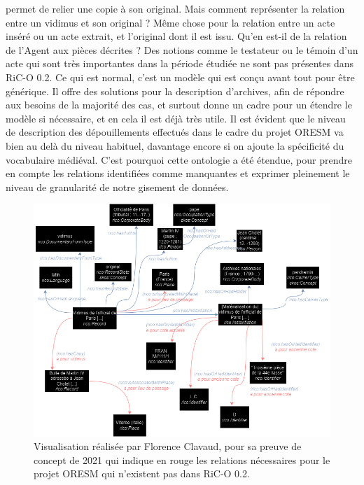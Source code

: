  permet de relier une copie à son original. Mais comment représenter la relation entre un vidimus et son original ? Même chose pour la relation entre un acte inséré ou un acte extrait, et l'original dont il est issu. Qu'en est-il de la relation de l'Agent aux pièces décrites ? Des notions comme le testateur ou le témoin d'un acte qui sont très importantes dans la période étudiée ne sont pas présentes dans RiC-O 0.2. Ce qui est normal, c'est un modèle qui est conçu avant tout pour être générique. Il offre des solutions pour la description d'archives, afin de répondre aux besoins de la majorité des cas, et surtout donne un cadre pour un étendre le modèle si nécessaire, et en cela il est déjà très utile. Il est évident que le niveau de description des dépouillements effectués dans le cadre du projet ORESM va bien au delà du niveau habituel, davantage encore si on ajoute la spécificité du vocabulaire médiéval. C'est pourquoi cette ontologie a été étendue, pour prendre en compte les relations identifiées comme manquantes et exprimer pleinement le niveau de granularité de notre gisement de données.
 \begin{figure}[!h]
     \centering
     \includegraphics[width=0.8\linewidth]{images/visualisation relations manquantes.png}
     \caption{Visualisation réalisée par Florence Clavaud, pour sa preuve de concept de 2021 qui indique en rouge les relations nécessaires pour le projet ORESM qui n'existent pas dans RiC-O 0.2.}
     \label{fig:enter-label}
 \end{figure}
